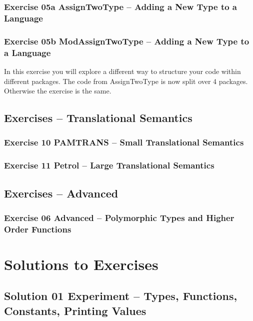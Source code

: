 \documentclass[10.5pt,a4]{article}
\begin{document}
\subsubsection{Exercise 05a AssignTwoType – Adding a New Type to a Language}
\lstset{language=}

\lstset{language=modelica}


\subsubsection{Exercise 05b ModAssignTwoType – Adding a New Type to a Language}
In this exercise you will explore a different way to structure your code
within different packages. The code from AssignTwoType is now split over 4 packages.
Otherwise the exercise is the same.

\subsection{Exercises – Translational Semantics}
\subsubsection{Exercise 10 PAMTRANS – Small Translational Semantics}
\lstset{language=}

\lstset{language=modelica}

\subsubsection{Exercise 11 Petrol – Large Translational Semantics}
\lstset{language=}

\lstset{language=modelica}

\subsection{Exercises – Advanced}
\subsubsection{Exercise 06 Advanced – Polymorphic Types and Higher Order Functions}
\lstset{language=}

\lstset{language=modelica}

\section{Solutions to Exercises}

\subsection{Solution 01 Experiment – Types, Functions, Constants, Printing Values}

\end{document}
